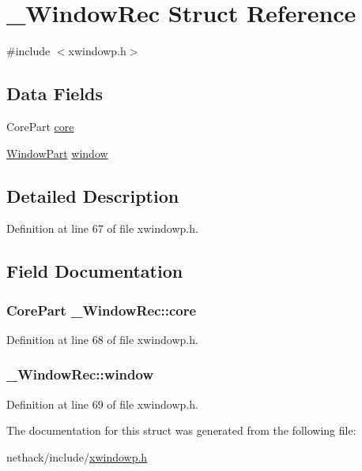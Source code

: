 \hypertarget{struct__WindowRec}{\section{\+\_\+\+Window\+Rec Struct Reference}
\label{struct__WindowRec}
}


{\ttfamily \#include $<$xwindowp.\+h$>$}

\subsection*{Data Fields}
\begin{DoxyCompactItemize}
\item 
Core\+Part \hyperlink{struct__WindowRec_aabe43a4f237d81dac78ddb3d2f1fe8f7}{core}
\item 
\hyperlink{structWindowPart}{Window\+Part} \hyperlink{struct__WindowRec_a93c75528956756d5dd254f697d7c0bd3}{window}
\end{DoxyCompactItemize}


\subsection{Detailed Description}


Definition at line 67 of file xwindowp.\+h.



\subsection{Field Documentation}
\hypertarget{struct__WindowRec_aabe43a4f237d81dac78ddb3d2f1fe8f7}{
\subsubsection[{core}]{\setlength{\rightskip}{0pt plus 5cm}Core\+Part \+\_\+\+Window\+Rec\+::core}}\label{struct__WindowRec_aabe43a4f237d81dac78ddb3d2f1fe8f7}


Definition at line 68 of file xwindowp.\+h.

\hypertarget{struct__WindowRec_a93c75528956756d5dd254f697d7c0bd3}{
\subsubsection[{window}]{ \+\_\+\+Window\+Rec\+::window}}\label{struct__WindowRec_a93c75528956756d5dd254f697d7c0bd3}


Definition at line 69 of file xwindowp.\+h.



The documentation for this struct was generated from the following file\+:\begin{DoxyCompactItemize}
\item 
nethack/include/\hyperlink{xwindowp_8h}{xwindowp.\+h}\end{DoxyCompactItemize}
